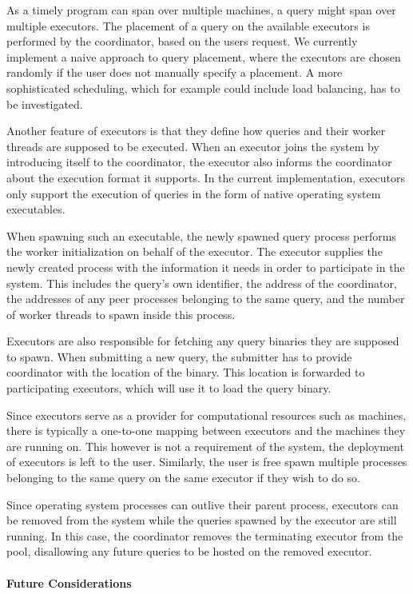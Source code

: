As a timely program can span over multiple machines, a query might span
over multiple executors. The placement of a query on the available executors
is performed by the coordinator, based on the users request.
We currently implement a naive approach to query placement, where the executors
are chosen randomly if the user does not manually specify a placement. A more
sophisticated scheduling, which for example could include load balancing,
has to be investigated.

Another feature of executors is that they define how queries and their
worker threads are supposed to be executed. When an executor joins
the system by introducing itself to the coordinator, the executor also informs
the coordinator about the execution format it supports. In the current
implementation, executors only support the execution of queries in the form of
native operating system executables.

When spawning such an executable, the newly spawned query process
performs the worker initialization on behalf of the executor. 
The executor supplies the newly created process with the information
it needs in order to participate in the system. This includes the query's own identifier,
the address of the coordinator, the addresses of any peer processes belonging to the 
same query, and the number of worker threads to spawn inside this process.

Executors are also responsible for fetching any query binaries they are supposed
to spawn. When submitting a new query, the submitter has to provide coordinator
with the location of the binary. This location is forwarded to participating executors,
which will use it to load the query binary. 

Since executors serve as a provider for computational resources such as machines,
there is typically a one-to-one mapping between executors and the machines they
are running on. This however is not a requirement of the system, the deployment of
executors is left to the user. Similarly, the user is free spawn multiple
processes belonging to the same query on the same executor if they wish to do so.

Since operating system processes can outlive their parent process, executors can
be removed from the system while the queries spawned by the executor are still
running. In this case, the coordinator removes the terminating executor from
the pool, disallowing any future queries to be hosted on the removed executor.

\paragraph{Future Considerations}

